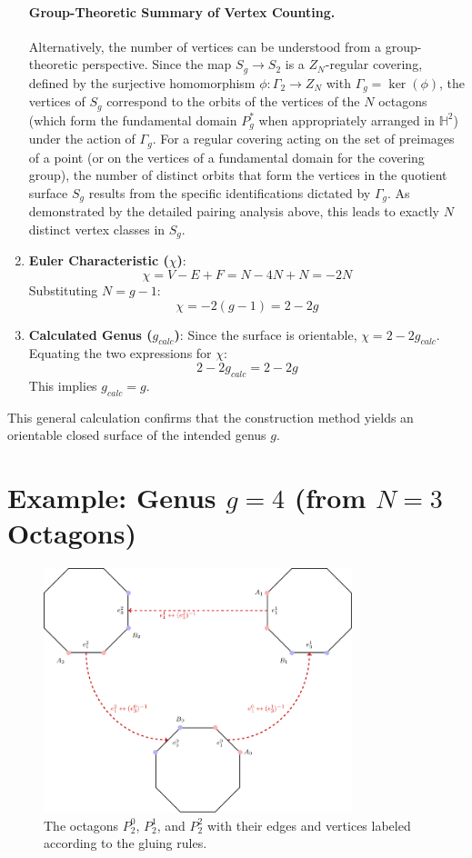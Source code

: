\documentclass{article}
\theoremstyle{definition}
\theoremstyle{remark}
\begin{document}
\begin{enumerate}
    \paragraph{Group-Theoretic Summary of Vertex Counting.}
    Alternatively, the number of vertices can be understood from a group-theoretic perspective. Since the map $S_g \to S_2$ is a $Z_N$-regular covering, defined by the surjective homomorphism $\phi: \Gamma_2 \to Z_N$ with $\Gamma_g = \ker(\phi)$, the vertices of $S_g$ correspond to the orbits of the vertices of the $N$ octagons (which form the fundamental domain $P_g^*$ when appropriately arranged in $\mathbb{H}^2$) under the action of $\Gamma_g$. For a regular covering acting on the set of preimages of a point (or on the vertices of a fundamental domain for the covering group), the number of distinct orbits that form the vertices in the quotient surface $S_g$ results from the specific identifications dictated by $\Gamma_g$. As demonstrated by the detailed pairing analysis above, this leads to exactly $N$ distinct vertex classes in $S_g$.

    \item \textbf{Euler Characteristic ($\chi$)}:
    $$ \chi = V - E + F = N - 4N + N = -2N $$
    Substituting $N = g-1$:
    $$ \chi = -2(g-1) = 2 - 2g $$

    \item \textbf{Calculated Genus ($g_{calc}$)}:
    Since the surface is orientable, $\chi = 2 - 2g_{calc}$. Equating the two expressions for $\chi$:
    $$ 2 - 2g_{calc} = 2 - 2g $$
    This implies $g_{calc} = g$.
\end{enumerate}
This general calculation confirms that the construction method yields an orientable closed surface of the intended genus $g$.

\section*{Example: Genus $g=4$ (from $N=3$ Octagons)}

\begin{figure}[h]
    \centering
    \includegraphics[width=0.8\textwidth]{images/group-symmetry}
    \caption{The octagons $P_2^0$, $P_2^1$, and $P_2^2$ with their edges and vertices labeled according to the gluing rules.}
    \label{fig:octagons}
\end{figure}
\end{document}
